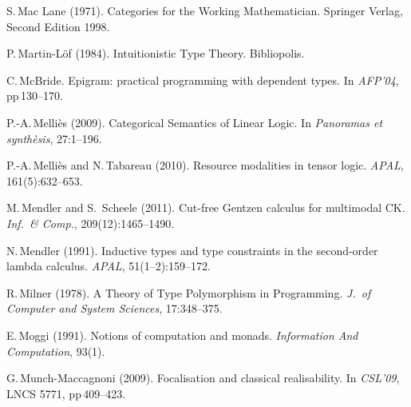 \documentclass[11pt,twocolumn]{article}
\begin{document}
{\begin{thebibliography}{000}

S.\,Mac Lane (1971).
\newblock Categories for the Working Mathematician.
\newblock Springer Verlag, Second Edition 1998.


P.\,Martin-L{\"o}f (1984).
\newblock Intuitionistic Type Theory.
\newblock Bibliopolis.


C.\,McBride.
\newblock Epigram: practical programming with dependent types.
\newblock In \emph{AFP'04}, pp\,130--170.

P.-A.\,Melli\`es (2009).
\newblock Categorical Semantics of Linear Logic.
\newblock In \emph{Panoramas et synth\`esis}, 27:1--196.

P.-A.\,Melli\`es and N.\,Tabareau (2010).
\newblock Resource modalities in tensor logic.
\newblock \emph{APAL}, 161(5):632--653.

M.\,Mendler and S.\, Scheele (2011).
\newblock Cut-free Gentzen calculus for multimodal CK.
\newblock \emph{Inf.\ \& Comp.}, 209(12):1465--1490.

N.\,Mendler (1991). 
\newblock Inductive types and type constraints in the second-order lambda
calculus. 
\newblock \emph{APAL}, 51(1--2):159--172.

R.\,Milner (1978).
\newblock A Theory of Type Polymorphism in Programming.
\newblock \emph{J.\ of Computer and System Sciences}, 17:348--375.

E.\,Moggi (1991).
\newblock Notions of computation and monads. 
\newblock \emph{Information And Computation}, 93(1).

G.\,Munch-Maccagnoni (2009).
\newblock Focalisation and classical realisability.
\newblock In \emph{CSL'09}, LNCS 5771, pp\,409--423.


\end{thebibliography}}
\end{document}
